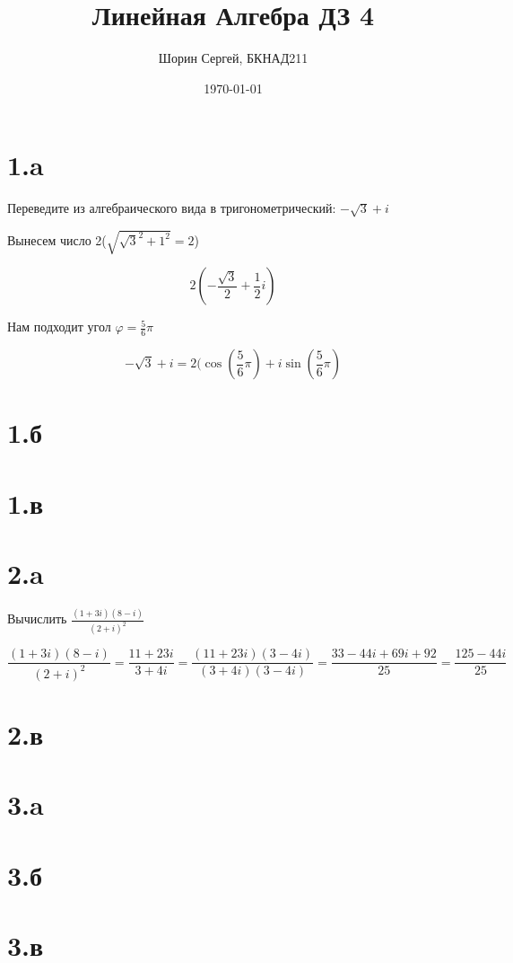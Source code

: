 \documentclass[a4paper]{article}
\author{Шорин Сергей, БКНАД211}
\title{Линейная Алгебра ДЗ 4}
\date{\today}
\begin{document}
\maketitle

\newpage

\section*{1.a}
Переведите из алгебраического вида в тригонометрический: $ -\sqrt{3} + i$

Вынесем число 2($ \sqrt{\sqrt{3}^2 + 1^2} = 2$)

$$2 ( -\frac{\sqrt{3}}{2} + \frac{1}{2}i)$$

Нам подходит угол $\varphi = \frac{5}{6} \pi$

$$ -\sqrt{3} + i = 2(\cos(\frac{5}{6} \pi) + i\sin(\frac{5}{6} \pi)$$



\section*{1.б}

\section*{1.в}

\section*{2.a}
Вычислить $\frac{(1 + 3i)(8 - i)}{(2 + i)^ 2}$

$$\frac{(1 + 3i)(8 - i)}{(2 + i)^ 2}= \frac{11 + 23i}{3 + 4i} = \frac{(11 + 23i)(3 - 4i)}{(3 + 4i)(3 - 4i)}= \frac{33 -44i + 69i + 92}{25} = \frac{125 -44i}{25}$$

\section*{2.в}

\section*{3.a}

\section*{3.б}

\section*{3.в}
\end{document}
